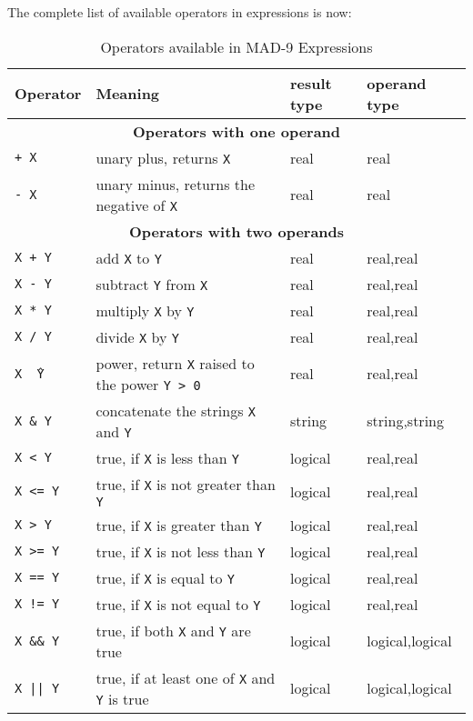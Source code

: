 \documentclass{article}
\begin{document}
The complete list of available operators in expressions is now:
\begin{table}[ht]
\begin{center}  
\begin{tabular}{|l|p{}|l|l|}
\hline
Operator & Meaning & result type & operand type \\
\hline
\multicolumn{4}{|c|}{\textbf{Operators with one operand}} \\
\hline
\texttt{+ X} & unary plus, returns \texttt{X} & real &real \\
\hline
\texttt{- X} & unary minus, returns the negative of \texttt{X} & real
&real \\
\hline
\multicolumn{4}{|c|}{\textbf{Operators with two operands}} \\
\hline
\texttt{X + Y} & add \texttt{X} to \texttt{Y} & real & real,real \\
\hline
\texttt{X - Y} & subtract \texttt{Y} from \texttt{X} & real & real,real \\
\hline
\texttt{X * Y} & multiply \texttt{X} by \texttt{Y} & real & real,real \\
\hline
\texttt{X / Y} & divide \texttt{X} by \texttt{Y} & real & real,real \\
\hline
\texttt{X \^\  Y} & power, return \texttt{X} raised to the power \texttt{Y > 0} &
real & real,real \\
\hline
\texttt{X \& Y} & concatenate the strings \texttt{X} and \texttt{Y} &
string & string,string \\
\texttt{X < Y} &
true, if \texttt{X} is less than \texttt{Y} & logical & real,real \\
\hline
\texttt{X <= Y} & true, if \texttt{X} is not greater than \texttt{Y} &
logical & real,real \\
\hline
\texttt{X > Y} &
true, if \texttt{X} is greater than \texttt{Y} & logical & real,real \\
\hline
\texttt{X >= Y} & true, if \texttt{X} is not less than \texttt{Y} &
logical & real,real \\
\hline
\texttt{X == Y} & true, if \texttt{X} is equal to \texttt{Y} & 
logical & real,real \\
\hline
\texttt{X != Y} & true, if \texttt{X} is not equal to \texttt{Y} & 
logical & real,real \\
\hline
\texttt{X \&\& Y} & true, if both \texttt{X} and \texttt{Y} are true &
logical & logical,logical \\
\hline
\texttt{X || Y} & true, if at least one of \texttt{X} and \texttt{Y} is true &
logical & logical,logical \\
\hline
\end{tabular}
\end{center}
\caption{Operators available in MAD-9 Expressions}
\label{tab:operators}
\end{table}
\end{document}
